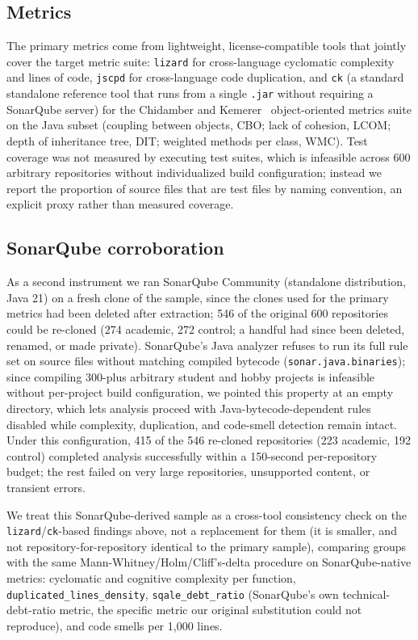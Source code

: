 \documentclass{cleiej}
\providecommand{\citep}[1]{\cite{#1}}
\begin{document}
\subsection{Metrics}
The primary metrics come from lightweight, license-compatible tools that jointly cover the target metric suite: \texttt{lizard} for cross-language cyclomatic complexity~\citep{mccabe1976complexity} and lines of code, \texttt{jscpd} for cross-language code duplication, and \texttt{ck} (a standard standalone reference tool that runs from a single \texttt{.jar} without requiring a SonarQube server) for the Chidamber and Kemerer~\citep{chidamber1994metrics} object-oriented metrics suite on the Java subset (coupling between objects, CBO; lack of cohesion, LCOM; depth of inheritance tree, DIT; weighted methods per class, WMC). Test coverage was not measured by executing test suites, which is infeasible across 600 arbitrary repositories without individualized build configuration; instead we report the proportion of source files that are test files by naming convention, an explicit proxy rather than measured coverage.

\subsection{SonarQube corroboration}
As a second instrument we ran SonarQube Community (standalone distribution, Java 21) on a fresh clone of the sample, since the clones used for the primary metrics had been deleted after extraction; 546 of the original 600 repositories could be re-cloned (274 academic, 272 control; a handful had since been deleted, renamed, or made private). SonarQube's Java analyzer refuses to run its full rule set on source files without matching compiled bytecode (\texttt{sonar.java.binaries}); since compiling 300-plus arbitrary student and hobby projects is infeasible without per-project build configuration, we pointed this property at an empty directory, which lets analysis proceed with Java-bytecode-dependent rules disabled while complexity, duplication, and code-smell detection remain intact. Under this configuration, 415 of the 546 re-cloned repositories (223 academic, 192 control) completed analysis successfully within a 150-second per-repository budget; the rest failed on very large repositories, unsupported content, or transient errors.

We treat this SonarQube-derived sample as a cross-tool consistency check on the \texttt{lizard}/\texttt{ck}-based findings above, not a replacement for them (it is smaller, and not repository-for-repository identical to the primary sample), comparing groups with the same Mann-Whitney/Holm/Cliff's-delta procedure on SonarQube-native metrics: cyclomatic and cognitive complexity per function, \texttt{duplicated\_lines\_density}, \texttt{sqale\_debt\_ratio} (SonarQube's own technical-debt-ratio metric, the specific metric our original substitution could not reproduce), and code smells per 1,000 lines.
\end{document}
